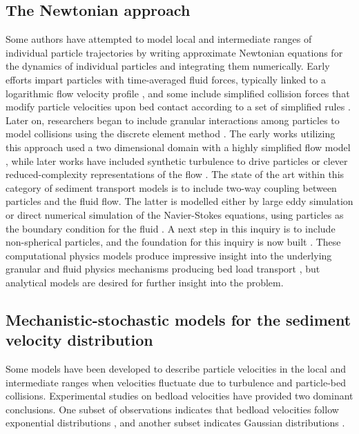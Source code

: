 \subsection{The Newtonian approach}

Some authors have attempted to model local and intermediate ranges of individual particle trajectories by writing approximate Newtonian equations for the dynamics of individual particles and integrating them numerically. Early efforts impart particles with time-averaged fluid forces, typically linked to a logarithmic flow velocity profile \citep{VanRijn1984}, and some include simplified collision forces that modify particle velocities upon bed contact according to a set of simplified rules \citep{Wiberg1985,Sekine1992}.
Later on, researchers began to include granular interactions among particles to model collisions using the discrete element method \citep{Cundall1979a, Haff1993}.
The early works utilizing this approach used a two dimensional domain with a highly simplified flow model \citep{Haff1993}, while later works have included synthetic turbulence to drive particles \citep{McEwan2001,Schmeeckle2003,Maurin2015} or clever reduced-complexity representations of the flow \citep{Clark2015,Clark2017}.
The state of the art within this category of sediment transport models is to include two-way coupling between particles and the fluid flow. The latter is modelled either by large eddy simulation or direct numerical simulation of the Navier-Stokes equations, using particles as the boundary condition for the fluid \citep{Schmeeckle2014,Ji2013,Gonzalez2017,Vowinckel2014,Elghannay2017,Yousefi2020}.
A next step in this inquiry is to include non-spherical particles, and the foundation for this inquiry is now built \citep{Wachs2012, Azema2012, Wachs2019}.
These computational physics models produce impressive insight into the underlying granular and fluid physics mechanisms producing bed load transport \citep{Frey2011}, but analytical models are desired for further insight into the problem.

\subsection{Mechanistic-stochastic models for the sediment velocity distribution}
\label{sec:langevin}

Some models have been developed to describe particle velocities in the local and intermediate ranges when velocities fluctuate due to turbulence and particle-bed collisions.
Experimental studies on bedload velocities have provided two dominant conclusions. One subset of observations indicates that bedload velocities follow exponential distributions \citep{Lajeunesse2010,Furbish2012,Fathel2015}, and another subset indicates Gaussian distributions \citep{Martin2012,Ancey2014,Heyman2016}.


